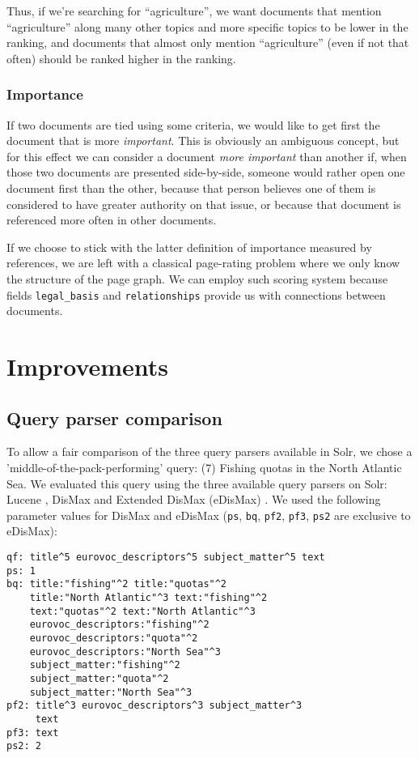 \documentclass[sigconf, authorversion]{acmart}
\begin{document}
Thus, if we're searching for ``agriculture'', we want documents that mention ``agriculture'' along many other topics and more specific topics to be lower in the ranking, and documents that almost only mention ``agriculture'' (even if not that often) should be ranked higher in the ranking.

\subsubsection{Importance} \label{sec:futurework-importance}

If two documents are tied using some criteria, we would like to get first the document that is more \textit{important}. This is obviously an ambiguous concept, but for this effect we can consider a document \textit{more important} than another if, when those two documents are presented side-by-side, someone would rather open one document first than the other, because that person believes one of them is considered to have greater authority on that issue, or because that document is referenced more often in other documents.

If we choose to stick with the latter definition of importance measured by references, we are left with a classical page-rating problem where we only know the structure of the page graph. We can employ such scoring system because fields \texttt{legal\_basis} and \texttt{relationships} provide us with connections between documents.

\section{Improvements}
\subsection{Query parser comparison}

To allow a fair comparison of the three query parsers available in Solr, we chose a 'middle-of-the-pack-performing' query: (7) Fishing quotas in the North Atlantic Sea. We evaluated this query using the three available query parsers on Solr: Lucene \cite{lucene}, DisMax \cite{dismax} and Extended DisMax (eDisMax) \cite{edismax}.
We used the following parameter values for DisMax and eDisMax (\texttt{ps}, \texttt{bq}, \texttt{pf2}, \texttt{pf3}, \texttt{ps2} are exclusive to eDisMax):
\begin{verbatim}
qf: title^5 eurovoc_descriptors^5 subject_matter^5 text
ps: 1
bq: title:"fishing"^2 title:"quotas"^2
    title:"North Atlantic"^3 text:"fishing"^2
    text:"quotas"^2 text:"North Atlantic"^3
    eurovoc_descriptors:"fishing"^2
    eurovoc_descriptors:"quota"^2
    eurovoc_descriptors:"North Sea"^3
    subject_matter:"fishing"^2
    subject_matter:"quota"^2
    subject_matter:"North Sea"^3
pf2: title^3 eurovoc_descriptors^3 subject_matter^3
     text
pf3: text
ps2: 2
\end{verbatim}
\end{document}
